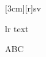 \documentclass[12pt]{article}
\begin{document}
\savebox{\mybox}[3cm][r]{sv}\begin{lrbox}{\other}lr text\end{lrbox}A\usebox{\mybox}B\usebox{\other}C
\end{document}
